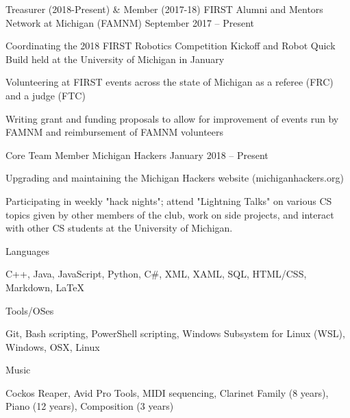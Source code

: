 \documentclass[]{awesome-cv}
\begin{document}
	\vspace{-4mm}
	\cventry
	{Treasurer (2018-Present) \& Member (2017-18)}
	{FIRST Alumni and Mentors Network at Michigan (FAMNM)}
	{}
	{September 2017 – Present}
	{\begin{cvitems}
		\item {Coordinating the 2018 FIRST Robotics Competition Kickoff and Robot Quick Build held at the University of Michigan in January}
		\item {Volunteering at FIRST events across the state of Michigan as a referee (FRC) and a judge (FTC)}
		\item {Writing grant and funding proposals to allow for improvement of events run by FAMNM and reimbursement of FAMNM volunteers}
		\end{cvitems}}
	
	\vspace{-4mm}
	\cventry
	{Core Team Member}
	{Michigan Hackers}
	{}
	{January 2018 – Present}
	{\begin{cvitems}
		\item {Upgrading and maintaining the Michigan Hackers website (michiganhackers.org)}
		\item {Participating in weekly "hack nights"; attend "Lightning Talks" on various CS topics given by other members of the club, work on side projects, and interact with other CS students at the University of Michigan.}
		\end{cvitems}}
	\vspace{-4mm}

\vspace{-2mm}
\vspace{-3mm}
	\cventry
	{}
	{Languages}
	{}
	{}
	{\begin{cvitems}
		\vspace{-7mm}
		\item {C++, Java, JavaScript, Python, C\#, XML, XAML, SQL, HTML/CSS, Markdown, LaTeX}
		\end{cvitems}}

	\vspace{-8mm}
	\cventry
	{}
	{Tools/OSes}
	{}
	{}
	{\begin{cvitems}
		\vspace{-7mm}
		\item {Git, Bash scripting, PowerShell scripting, Windows Subsystem for Linux (WSL), Windows, OSX, Linux}
		\end{cvitems}}
	
	\vspace{-8mm}
	\cventry
	{}
	{Music}
	{}
	{}
	{\begin{cvitems}
		\vspace{-7mm}
		\item {Cockos Reaper, Avid Pro Tools, MIDI sequencing, Clarinet Family (8 years), Piano (12 years), Composition (3 years)}
		\end{cvitems}}
	\vspace{-4mm}
\end{document}
